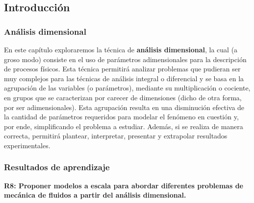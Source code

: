 \documentclass[t]{beamer}
\begin{document}
\subsection{Introducción}
\begin{frame}[c]
\frametitle{Análisis dimensional}

En este capítulo exploraremos la técnica de \textbf{análisis dimensional}, la cual (a groso modo) consiste en el uso de parámetros adimensionales para la descripción de procesos físicos. Esta técnica permitirá analizar problemas que pudieran ser muy complejos para las técnicas de análisis integral o diferencial y se basa en la agrupación de las variables (o parámetros), mediante su multiplicación o cociente, en grupos que se caracterizan por carecer de dimensiones (dicho de otra forma, por ser adimensionales). Esta agrupación resulta en una disminución efectiva de la cantidad de parámetros requeridos para modelar el fenómeno en cuestión y, por ende, simplificando el problema a estudiar. Además, si se realiza de manera correcta, permitirá plantear, interpretar, presentar y extrapolar resultados experimentales.


\end{frame}

\begin{frame}[c]
\frametitle{Resultados de aprendizaje}

\begin{Large}
{\textbf{R8:	 Proponer modelos a escala para abordar diferentes problemas de mecánica de fluidos a partir del análisis dimensional.}}
\end{Large}

\end{frame}


\end{document}
